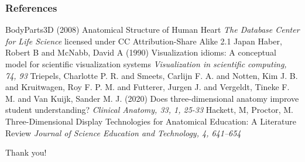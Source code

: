 \documentclass{beamer}
\begin{document}
\begin{frame}
\frametitle{References}
\footnotesize{
\begin{thebibliography}{99} %
 BodyParts3D (2008)
\newblock Anatomical Structure of Human Heart
\newblock \emph{The Database Center for Life Science} licensed under CC Attribution-Share Alike 2.1 Japan
 Haber, Robert B and McNabb, David A (1990)
\newblock Visualization idioms: A conceptual model for scientific visualization systems
\newblock \emph{Visualization in scientific computing, 74, 93}
 Triepels, Charlotte P. R. and Smeets, Carlijn F. A. and Notten, Kim J. B. and Kruitwagen, Roy F. P. M. and Futterer, Jurgen J. and Vergeldt, Tineke F. M. and Van Kuijk, Sander M. J. (2020)
\newblock Does three-dimensional anatomy improve student understanding?
\newblock \emph{Clinical Anatomy, 33, 1, 25-33}
 Hackett, M, Proctor, M.
\newblock Three-Dimensional Display Technologies for Anatomical Education: A Literature Review
\newblock \emph{Journal of Science Education and Technology, 4, 641--654}
\end{thebibliography}
}
\end{frame}


\begin{frame}
\Huge{\centerline{Thank you!}}
\end{frame}

\end{document}
